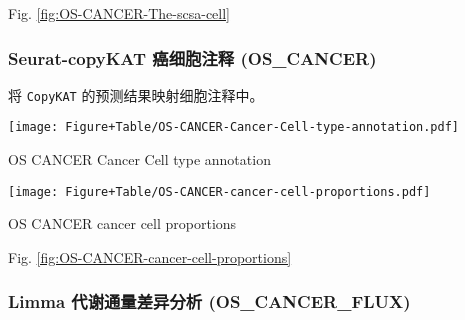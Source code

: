 \documentclass[
]{article}
\begin{document}
Fig. \ref{fig:OS-CANCER-The-scsa-cell}

\hypertarget{seurat-copykat-ux764cux7ec6ux80deux6ce8ux91ca-os_cancer}{%
\subsubsection{Seurat-copyKAT 癌细胞注释 (OS\_CANCER)}\label{seurat-copykat-ux764cux7ec6ux80deux6ce8ux91ca-os_cancer}}

将 \texttt{CopyKAT} 的预测结果映射细胞注释中。

\begin{center}\vspace{1.5cm}\end{center}
\def\@captype{figure}
\begin{center}
\texttt{[image: Figure+Table/OS-CANCER-Cancer-Cell-type-annotation.pdf]}
\caption{OS CANCER Cancer Cell type annotation}\label{fig:OS-CANCER-Cancer-Cell-type-annotation}
\end{center}

\begin{center}\vspace{1.5cm}\end{center}

\begin{center}\vspace{1.5cm}\end{center}
\def\@captype{figure}
\begin{center}
\texttt{[image: Figure+Table/OS-CANCER-cancer-cell-proportions.pdf]}
\caption{OS CANCER cancer cell proportions}\label{fig:OS-CANCER-cancer-cell-proportions}
\end{center}

\begin{center}\vspace{1.5cm}\end{center}

Fig. \ref{fig:OS-CANCER-cancer-cell-proportions}

\hypertarget{limma-ux4ee3ux8c22ux901aux91cfux5deeux5f02ux5206ux6790-os_cancer_flux}{%
\subsubsection{Limma 代谢通量差异分析 (OS\_CANCER\_FLUX)}\label{limma-ux4ee3ux8c22ux901aux91cfux5deeux5f02ux5206ux6790-os_cancer_flux}}
\end{document}
